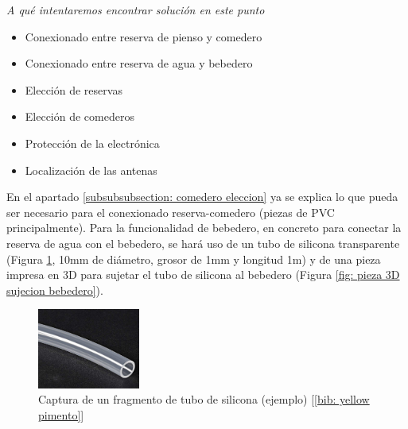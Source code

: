 \documentclass[12pt]{article}
\begin{document}
	\noindent \textit{A qué intentaremos encontrar solución en este punto} \\
	
	\begin{itemize}
		\item Conexionado entre reserva de pienso y comedero
		\item Conexionado entre reserva de agua y bebedero
		\item Elección de reservas
		\item Elección de comederos
		\item Protección de la electrónica
		\item Localización de las antenas
	\end{itemize}

	\noindent En el apartado \ref{subsubsubsection: comedero eleccion}  ya se explica lo que pueda ser necesario para el conexionado reserva-comedero (piezas de PVC principalmente). Para la funcionalidad de bebedero, en concreto para conectar la reserva de agua con el bebedero, se hará uso de un tubo de silicona transparente (Figura \ref{Captura tubo silicona}, 10mm de diámetro, grosor de 1mm y longitud 1m) y de una pieza impresa en 3D para sujetar el tubo de silicona al bebedero (Figura \ref{fig: pieza 3D sujecion bebedero}). \\
	
	\pagebreak
	
	
	\begin{figure}[h!]
		\begin{center}
			\includegraphics[width=0.30\textwidth]{img/tubo_silicona.png}
			\caption{Captura de un fragmento de tubo de silicona (ejemplo) [\ref{bib: yellow pimento}]}
			\label{Captura tubo silicona}
		\end{center}
	\end{figure}
\end{document}
